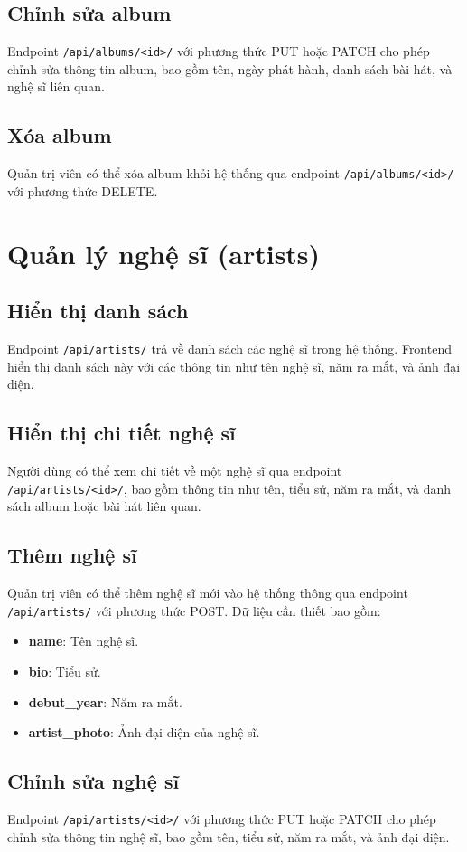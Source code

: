 \subsection{Chỉnh sửa album}
Endpoint \texttt{/api/albums/<id>/} với phương thức PUT hoặc PATCH cho phép chỉnh sửa thông tin album, bao gồm tên, ngày phát hành, danh sách bài hát, và nghệ sĩ liên quan.

\subsection{Xóa album}
Quản trị viên có thể xóa album khỏi hệ thống qua endpoint \texttt{/api/albums/<id>/} với phương thức DELETE.

\section{Quản lý nghệ sĩ (artists)}
\subsection{Hiển thị danh sách}
Endpoint \texttt{/api/artists/} trả về danh sách các nghệ sĩ trong hệ thống. Frontend hiển thị danh sách này với các thông tin như tên nghệ sĩ, năm ra mắt, và ảnh đại diện.

\subsection{Hiển thị chi tiết nghệ sĩ}
Người dùng có thể xem chi tiết về một nghệ sĩ qua endpoint \texttt{/api/artists/<id>/}, bao gồm thông tin như tên, tiểu sử, năm ra mắt, và danh sách album hoặc bài hát liên quan.

\subsection{Thêm nghệ sĩ}
Quản trị viên có thể thêm nghệ sĩ mới vào hệ thống thông qua endpoint \texttt{/api/artists/} với phương thức POST. Dữ liệu cần thiết bao gồm:
\begin{itemize}
    \item \textbf{name}: Tên nghệ sĩ.
    \item \textbf{bio}: Tiểu sử.
    \item \textbf{debut\_year}: Năm ra mắt.
    \item \textbf{artist\_photo}: Ảnh đại diện của nghệ sĩ.
\end{itemize}

\subsection{Chỉnh sửa nghệ sĩ}
Endpoint \texttt{/api/artists/<id>/} với phương thức PUT hoặc PATCH cho phép chỉnh sửa thông tin nghệ sĩ, bao gồm tên, tiểu sử, năm ra mắt, và ảnh đại diện.

